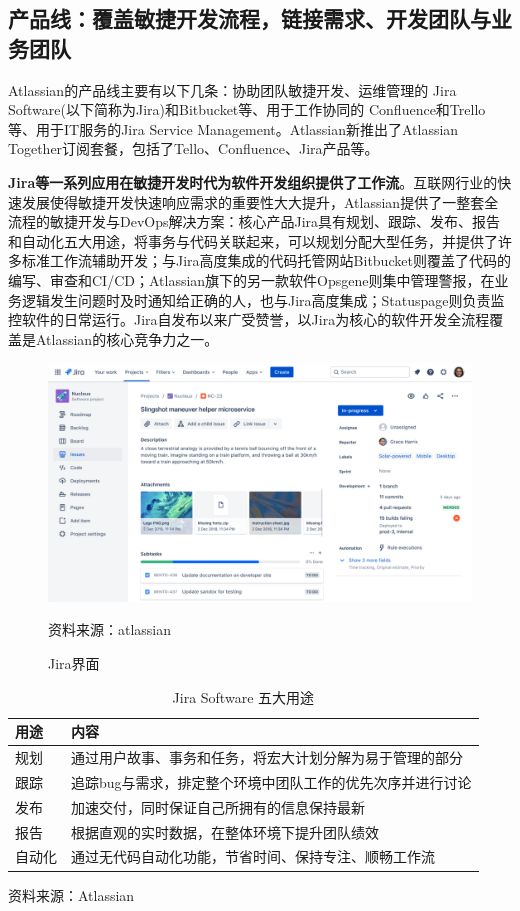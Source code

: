 \subsection{产品线：覆盖敏捷开发流程，链接需求、开发团队与业务团队}
Atlassian的产品线主要有以下几条：协助团队敏捷开发、运维管理的 Jira Software(以下简称为Jira)和Bitbucket等、用于工作协同的 Confluence和Trello等、用于IT服务的Jira Service Management。Atlassian新推出了Atlassian Together订阅套餐，包括了Tello、Confluence、Jira产品等。

\textbf{Jira等一系列应用在敏捷开发时代为软件开发组织提供了工作流}。互联网行业的快速发展使得敏捷开发快速响应需求的重要性大大提升，Atlassian提供了一整套全流程的敏捷开发与DevOps解决方案：核心产品Jira具有规划、跟踪、发布、报告和自动化五大用途，将事务与代码关联起来，可以规划分配大型任务，并提供了许多标准工作流辅助开发；与Jira高度集成的代码托管网站Bitbucket则覆盖了代码的编写、审查和CI/CD；Atlassian旗下的另一款软件Opsgene则集中管理警报，在业务逻辑发生问题时及时通知给正确的人，也与Jira高度集成；Statuspage则负责监控软件的日常运行。Jira自发布以来广受赞誉，以Jira为核心的软件开发全流程覆盖是Atlassian的核心竞争力之一。
\begin{figure}[H]
    \caption{Jira界面}
    \begin{center}
        \includegraphics[width=0.85\linewidth]{img/jira_issue.png}
    \end{center}
    \footnotesize{资料来源：atlassian}
\end{figure}
\begin{table}[H]
    \caption{Jira Software 五大用途}
    \begin{tabular}{ll}
        \toprule
        用途  & 内容                             \\
        \midrule
        规划  & 通过用户故事、事务和任务，将宏大计划分解为易于管理的部分   \\
        跟踪  & 追踪bug与需求，排定整个环境中团队工作的优先次序并进行讨论 \\
        发布  & 加速交付，同时保证自己所拥有的信息保持最新          \\
        报告  & 根据直观的实时数据，在整体环境下提升团队绩效         \\
        自动化 & 通过无代码自动化功能，节省时间、保持专注、顺畅工作流     \\
        \bottomrule
    \end{tabular}
    \footnotesize{资料来源：Atlassian}
\end{table}

